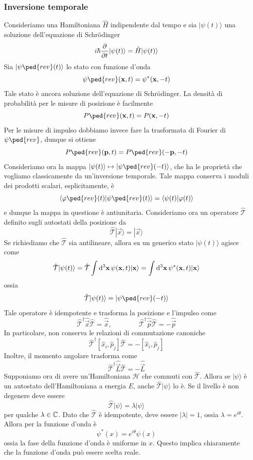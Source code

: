 \documentclass[a4paper, 11pt]{article}
\newcommand{\op}[1]{\hat{#1}}
\renewcommand{\H}{\mathcal{H}}
\renewcommand{\op}[1]{\hat{#1}}
\newcommand{\ham}{\hat{H}}
\renewcommand{\ket}[1]{| #1\rangle}
\newcommand{\T}{\op{\mathcal{T}}}
\begin{document}
\subsubsection{Inversione temporale}
Consideriamo una Hamiltoniana $\ham$ indipendente dal tempo e sia $\ket{\psi(t)}$ una soluzione dell'equazione di Schr\"odinger
\[i\hbar\pder{}{t}\ket{\psi(t)}=\ham\ket{\psi(t)}\]
Sia $\ket{\psi\ped{rev}(t)}$ lo stato con funzione d'onda
\[\psi\ped{rev}(\vec{x},t)=\psi^*(\vec{x},-t)\]
Tale stato è ancora soluzione dell'equazione di Schr\"odinger. La densità di probabilità per le misure di posizione è facilmente
\[P\ped{rev}(\vec{x},t)=P(\vec{x},-t)\]
Per le misure di impulso dobbiamo invece fare la trasformata di Fourier di $\psi\ped{rev}$, dunque si ottiene
\[P\ped{rev}(\vec{p},t)=P\ped{rev}(-\vec{p},-t)\]
Consideriamo ora la mappa $\ket{\psi(t)}\mapsto\ket{\psi\ped{rev}(-t)}$, che ha le proprietà che vogliamo classicamente da un'inversione temporale. Tale mappa conserva i moduli dei prodotti scalari, esplicitamente, è
\[\braket{\varphi\ped{rev}(t)}{\psi\ped{rev}(t)}=\braket{\psi(t)}{\varphi(t)}\]
e dunque la mappa in questione è antiunitaria. Consideriamo ora un operatore $\T$ definito sugli autostati della posizione da
\[\T\ket{\vec{x}}=\ket{\vec{x}}\]
Se richiediamo che $\T$ sia antilineare, allora su un generico stato $\ket{\psi(t)}$ agisce come
\[\T\ket{\psi(t)}=\T\int \d^3\vec{x}\,\psi(\vec{x},t)\ket{\vec{x}}=\int\d^3\vec{x}\,\psi^*(\vec{x},t)\ket{\vec{x}}\]
ossia
\[\T\ket{\psi(t)}=\ket{\psi\ped{rev}(-t)}\]
Tale operatore è idempotente e trasforma la posizione e l'impulso come
\[\T^\dagger\op{\vec{x}}\T=\op{\vec{x}},\qquad\qquad\T^\dagger\op{\vec{p}}\T=-\op{\vec{p}}\]
In particolare, non conserva le relazioni di commutazione canoniche
\[\T^\dagger[\op x_i,\op p_j]\T=-[\op x_i,\op p_j]\]
Inoltre, il momento angolare trasforma come
\[\T^\dagger\op{\vec{L}}\T=-\op{\vec{L}}\]
Supponiamo ora di avere un'Hamiltoniana $\H$ che commuti con $\T$. Allora se $\ket{\psi}$ è un autostato dell'Hamiltoniana a energia $E$, anche $\T\ket{\psi}$ lo è. Se il livello è non degenere deve essere
\[\T\ket{\psi}=\lambda\ket{\psi}\]
per qualche $\lambda\in\mathbb{C}$. Dato che $\T$ è idempotente, deve essere $|\lambda|=1$, ossia $\lambda=e^{i\theta}$. Allora per la funzione d'onda è
\[\psi^*(x)=e^{i\theta}\psi(x)\]
ossia la fase della funzione d'onda è uniforme in $x$. Questo implica chiaramente che la funzione d'onda può essere scelta reale.
\end{document}
